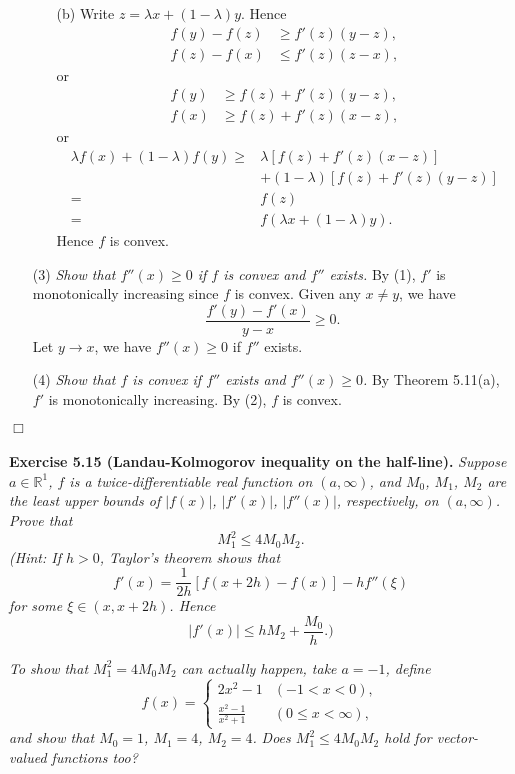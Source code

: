 \documentclass{article}
\begin{document}
\begin{enumerate}
\begin{enumerate}
  \item[(b)]
  Write $z = \lambda x + (1-\lambda)y$.
  Hence
  \begin{align*}
    f(y)-f(z) &\geq f'(z)(y-z), \\
    f(z)-f(x) &\leq f'(z)(z-x),
  \end{align*}
  or
  \begin{align*}
    f(y) &\geq f(z) + f'(z)(y-z), \\
    f(x) &\geq f(z) + f'(z)(x-z),
  \end{align*}
  or
  \begin{align*}
    \lambda f(x) + (1-\lambda)f(y)
    \geq&
    \lambda [f(z) + f'(z)(x-z)] \\
      &+ (1-\lambda)[f(z) + f'(z)(y-z)] \\
    =& f(z) \\
    =& f(\lambda x + (1-\lambda)y).
  \end{align*}
  Hence $f$ is convex.
  \end{enumerate}

\item[(3)]
  \emph{Show that $f''(x) \geq 0$ if $f$ is convex and $f''$ exists.}
  By (1), $f'$ is monotonically increasing since $f$ is convex.
  Given any $x \neq y$, we have
  \[
    \frac{f'(y)-f'(x)}{y - x} \geq 0.
  \]
  Let $y \to x$, we have $f''(x) \geq 0$ if $f''$ exists.

\item[(4)]
  \emph{Show that $f$ is convex if $f''$ exists and $f''(x) \geq 0$.}
  By Theorem 5.11(a), $f'$ is monotonically increasing.
  By (2), $f$ is convex.
\end{enumerate}
$\Box$ \\\\






\textbf{Exercise 5.15 (Landau-Kolmogorov inequality on the half-line).}
\emph{Suppose $a \in \mathbb{R}^1$,
$f$ is a twice-differentiable real function on $(a,\infty)$,
and $M_0$, $M_1$, $M_2$ are the least upper bounds of
$|f(x)|$, $|f'(x)|$, $|f''(x)|$, respectively, on $(a,\infty)$.
Prove that
\[
  M_1^2 \leq 4 M_0 M_2.
\]
(Hint: If $h>0$, Taylor's theorem shows that
\[
  f'(x) = \frac{1}{2h} [ f(x+2h) - f(x) ] - h f''(\xi)
\]
for some $\xi \in (x,x+2h)$.
Hence
\[
  |f'(x)| \leq h M_2 + \frac{M_0}{h}.)
\]}

\emph{To show that $M_1^2=4 M_0 M_2$ can actually happen, take $a=-1$, define
\begin{equation*}
  f(x) =
    \begin{cases}
      2x^2 - 1            & (-1 < x < 0), \\
      \frac{x^2-1}{x^2+1} & (0 \leq x < \infty),
    \end{cases}
\end{equation*}
and show that $M_0 = 1$, $M_1 = 4$, $M_2 = 4$.}
\emph{Does $M_1 ^2 \leq 4 M_0 M_2$ hold for vector-valued functions too?} \\
\end{document}
